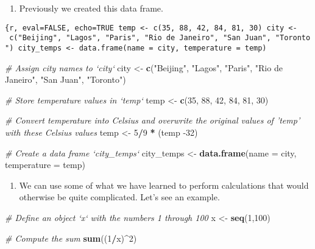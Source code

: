 \documentclass[
]{article}
\newenvironment{Shaded}{\begin{snugshade}}{\end{snugshade}}
\newcommand{\CommentTok}[1]{\textcolor[rgb]{0.56,0.35,0.01}{\textit{#1}}}
\newcommand{\DataTypeTok}[1]{\textcolor[rgb]{0.13,0.29,0.53}{#1}}
\newcommand{\DecValTok}[1]{\textcolor[rgb]{0.00,0.00,0.81}{#1}}
\newcommand{\KeywordTok}[1]{\textcolor[rgb]{0.13,0.29,0.53}{\textbf{#1}}}
\newcommand{\NormalTok}[1]{#1}
\newcommand{\OperatorTok}[1]{\textcolor[rgb]{0.81,0.36,0.00}{\textbf{#1}}}
\newcommand{\StringTok}[1]{\textcolor[rgb]{0.31,0.60,0.02}{#1}}
\providecommand{\tightlist}{%
  \setlength{\itemsep}{0pt}\setlength{\parskip}{0pt}}
\begin{document}
\begin{enumerate}
\def\labelenumi{\arabic{enumi}.}
\tightlist
\item
  Previously we created this data frame.
\end{enumerate}

\texttt{\{r,\ eval=FALSE,\ echo=TRUE\ temp\ \textless{}-\ c(35,\ 88,\ 42,\ 84,\ 81,\ 30)\ city\ \textless{}-\ c("Beijing",\ "Lagos",\ "Paris",\ "Rio\ de\ Janeiro",\ "San\ Juan",\ "Toronto")\ city\_temps\ \textless{}-\ data.frame(name\ =\ city,\ temperature\ =\ temp)}

\begin{Shaded}
\begin{Highlighting}[]
\CommentTok{# Assign city names to `city` }
\NormalTok{city <-}\StringTok{ }\KeywordTok{c}\NormalTok{(}\StringTok{"Beijing"}\NormalTok{, }\StringTok{"Lagos"}\NormalTok{, }\StringTok{"Paris"}\NormalTok{, }\StringTok{"Rio de Janeiro"}\NormalTok{, }\StringTok{"San Juan"}\NormalTok{, }\StringTok{"Toronto"}\NormalTok{)}

\CommentTok{# Store temperature values in `temp`}
\NormalTok{temp <-}\StringTok{ }\KeywordTok{c}\NormalTok{(}\DecValTok{35}\NormalTok{, }\DecValTok{88}\NormalTok{, }\DecValTok{42}\NormalTok{, }\DecValTok{84}\NormalTok{, }\DecValTok{81}\NormalTok{, }\DecValTok{30}\NormalTok{)}

\CommentTok{# Convert temperature into Celsius and overwrite the original values of 'temp' with these Celsius values}
\NormalTok{temp <-}\StringTok{ }\DecValTok{5}\OperatorTok{/}\DecValTok{9} \OperatorTok{*}\StringTok{ }\NormalTok{(temp }\DecValTok{-32}\NormalTok{)}

\CommentTok{# Create a data frame `city_temps` }
\NormalTok{city_temps <-}\StringTok{ }\KeywordTok{data.frame}\NormalTok{(}\DataTypeTok{name =}\NormalTok{ city, }\DataTypeTok{temperature =}\NormalTok{ temp)}
\end{Highlighting}
\end{Shaded}

\begin{enumerate}
\def\labelenumi{\arabic{enumi}.}
\setcounter{enumi}{1}
\tightlist
\item
  We can use some of what we have learned to perform calculations that
  would otherwise be quite complicated. Let's see an example.
\end{enumerate}

\begin{Shaded}
\begin{Highlighting}[]
\CommentTok{# Define an object `x` with the numbers 1 through 100}
\NormalTok{x <-}\StringTok{ }\KeywordTok{seq}\NormalTok{(}\DecValTok{1}\NormalTok{,}\DecValTok{100}\NormalTok{)}

\CommentTok{# Compute the sum }
\KeywordTok{sum}\NormalTok{((}\DecValTok{1}\OperatorTok{/}\NormalTok{x)}\OperatorTok{^}\DecValTok{2}\NormalTok{)}
\end{Highlighting}
\end{Shaded}
\end{document}
